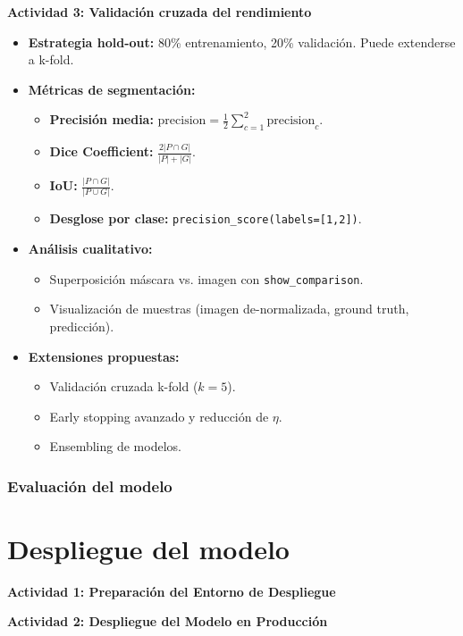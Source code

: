 \vspace{0.5cm}
\textbf{Actividad 3: Validación cruzada del rendimiento}

\begin{itemize}
  \item \textbf{Estrategia hold-out:}
    80\% entrenamiento, 20\% validación. Puede extenderse a k-fold.

  \item \textbf{Métricas de segmentación:}
    \begin{itemize}
      \item \textbf{Precisión media:} \(\text{precision} = \frac{1}{2}\sum_{c=1}^2 \text{precision}_c\).
      \item \textbf{Dice Coefficient:} \(\frac{2|P\cap G|}{|P|+|G|}\).
      \item \textbf{IoU:} \(\frac{|P\cap G|}{|P\cup G|}\).
      \item \textbf{Desglose por clase:} \texttt{precision\_score(labels=[1,2])}.
    \end{itemize}

  \item \textbf{Análisis cualitativo:}
    \begin{itemize}
      \item Superposición máscara vs. imagen con \texttt{show\_comparison}.
      \item Visualización de muestras (imagen de-normalizada, ground truth, predicción).
    \end{itemize}

  \item \textbf{Extensiones propuestas:}
    \begin{itemize}
      \item Validación cruzada k-fold (\(k=5\)).
      \item Early stopping avanzado y reducción de \(\eta\).
      \item Ensembling de modelos.
    \end{itemize}
\end{itemize}


\subsubsection{Evaluación del modelo}


\section{Despliegue del modelo}
\textbf{Actividad 1: Preparación del Entorno de Despliegue}

\textbf{Actividad 2: Despliegue del Modelo en Producción}
